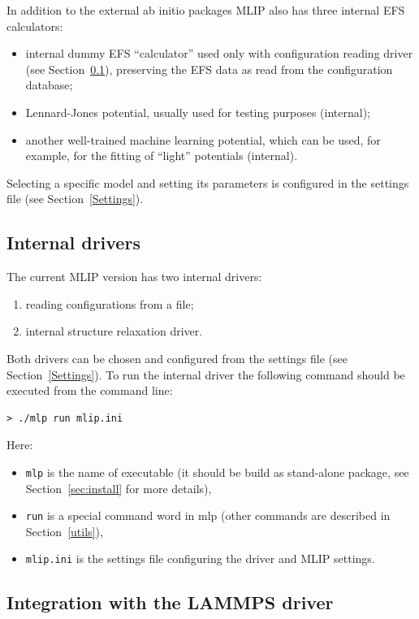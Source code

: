 \documentclass[12pt]{article}
\renewcommand{\_}{\char`_}
\begin{document}
In addition to the external ab initio packages MLIP also has three internal EFS calculators:
\begin{itemize}
	\item internal dummy EFS ``calculator'' used only with configuration reading driver (see Section~\ref{internal_drivers}), preserving the EFS data as read from the configuration database;
	\item Lennard-Jones potential, usually used for testing purposes (internal);
	\item another well-trained machine learning potential, which can be used, for example, for the fitting of ``light'' potentials (internal).
\end{itemize}

Selecting a specific model and setting its parameters is configured in the settings file (see Section~\ref{Settings}). 


\subsection{Internal drivers}\label{internal_drivers}

The current MLIP version has two internal drivers:
\begin{enumerate}
	\item reading configurations from a file;
	\item internal structure relaxation driver.
\end{enumerate}
Both drivers can be chosen and configured from the settings file (see Section~\ref{Settings}). To run the internal driver the following command should be executed from the command line:
\begin{verbatim}
> ./mlp run mlip.ini
\end{verbatim}
Here:
\begin{itemize}[leftmargin=20pt, topsep=0pt, partopsep=0pt, itemsep=0pt, parsep=0pt, itemindent=-10pt]
	\item[] \texttt{mlp} is the name of executable (it should be build as stand-alone package, see Section~\ref{sec:install} for more details),
	\item[] \texttt{run} is a special command word in mlp (other commands are described in Section~\ref{utils}),
	\item[] \texttt{mlip.ini} is the settings file configuring the driver and MLIP settings.
\end{itemize}


\subsection{Integration with the LAMMPS driver}\label{lammps_drivers}
\end{document}
